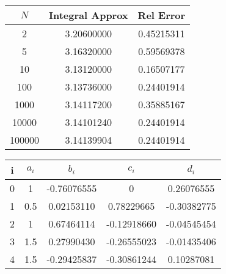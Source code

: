 \documentclass[paper=a4, fontsize=11pt]{scrartcl} %
\numberwithin{equation}{section} %
\numberwithin{figure}{section} %
\numberwithin{table}{section} %
\begin{document}
\begin{center}
  \begin{tabular}{ | c || c | c | }
    \hline
    $N$    & Integral Approx & Rel Error \\ \hline
    2      & 3.20600000      & 0.45215311 \\ \hline
    5      & 3.16320000      & 0.59569378 \\ \hline
    10     & 3.13120000      & 0.16507177 \\ \hline
    100    & 3.13736000      & 0.24401914 \\ \hline
    1000   & 3.14117200      & 0.35885167 \\
    10000  & 3.14101240      & 0.24401914 \\ \hline
    100000 & 3.14139904      & 0.24401914 \\
    \hline
  \end{tabular}
\end{center}


\begin{center}
  \begin{tabular}{ c || c | c | c | c }
    i & $a_i$ & $b_i$ & $c_i$ & $d_i$\\ \hline
    0 & 1   &-0.76076555 & 0          & 0.26076555 \\ \hline
    1 & 0.5 & 0.02153110 & 0.78229665 &-0.30382775 \\ \hline
    2 & 1   & 0.67464114 &-0.12918660 &-0.04545454 \\ \hline
    3 & 1.5 & 0.27990430 &-0.26555023 &-0.01435406 \\ \hline
    4 & 1.5 &-0.29425837 &-0.30861244 & 0.10287081 \\
    \hline
  \end{tabular}
\end{center}






\section{}




\end{document}
